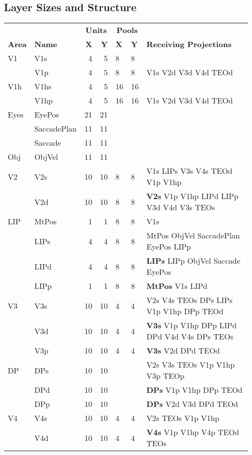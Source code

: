 \documentclass[12pt,twoside]{naturefigs}
\newif\myifpdf
\begin{document}
\subsection{Layer Sizes and Structure}

\begin{table}
  \centering
\begin{tabular}{llrrlll}
\hline
     &      & \multicolumn{2}{c}{{\bf Units}} & \multicolumn{2}{c}{{\bf Pools}} & \\
{\bf Area} & {\bf Name} & {\bf X} & {\bf Y} & {\bf X} & {\bf Y} & {\bf Receiving Projections} \\
\hline
V1 & V1s & 4 & 5 & 8 & 8 &  \\
   & V1p & 4 & 5 & 8 & 8 & V1s V2d V3d V4d TEOd  \\
V1h & V1hs & 4 & 5 & 16 & 16 &  \\
   & V1hp & 4 & 5 & 16 & 16 & V1s V2d V3d V4d TEOd  \\
Eyes & EyePos & 21 & 21 & & &  \\
     & SaccadePlan & 11 & 11 & & &  \\
     & Saccade & 11 & 11 & & &  \\
Obj & ObjVel & 11 & 11 & & & \\
V2 & V2s & 10 & 10 & 8 & 8 & V1s LIPs V3s V4s TEOd V1p V1hp \\
   & V2d & 10 & 10 & 8 & 8 & {\bf V2s} V1p V1hp LIPd LIPp V3d V4d V3s TEOs \\
LIP & MtPos& 1 & 1 & 8 & 8 & V1s \\
    & LIPs & 4 & 4 & 8 & 8 & MtPos ObjVel SaccadePlan EyePos LIPp \\
    & LIPd & 4 & 4 & 8 & 8 & {\bf LIPs} LIPp ObjVel Saccade EyePos \\
    & LIPp & 1 & 1 & 8 & 8 & {\bf MtPos} V1s LIPd \\
V3 & V3s & 10 & 10 & 4 & 4 & V2s V4s TEOs DPs LIPs V1p V1hp DPp TEOd \\
   & V3d & 10 & 10 & 4 & 4 & {\bf V3s} V1p V1hp DPp LIPd DPd V4d V4s DPs TEOs \\
   & V3p & 10 & 10 & 4 & 4 & {\bf V3s} V2d DPd TEOd \\
DP & DPs & 10 & 10 & & & V2s V3s TEOs V1p V1hp V3p TEOp \\
   & DPd & 10 & 10 & & & {\bf DPs} V1p V1hp DPp TEOd \\
   & DPp & 10 & 10 & & & {\bf DPs} V2d V3d DPd TEOd \\
V4 & V4s & 10 & 10 & 4 & 4 & V2s TEOs V1p V1hp \\
   & V4d & 10 & 10 & 4 & 4 & {\bf V4s} V1p V1hp V4p TEOd TEOs \\

\end{tabular}
\end{table}
\end{document}
